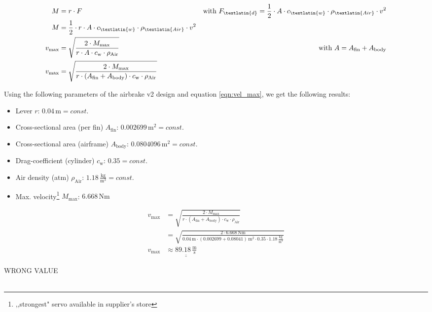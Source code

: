 \documentclass[fontsize=11pt,%
twoside,%
BCOR          = 8mm, %
DIV           = 11,  %
titlepage     = off,%
index=totoc,%
xcolor        = pdftex,%
dvipsnames,%
bibliography  = totoc,%
bibliography = numbered, %
listof        = notnumbered]{scrreprt}
\begin{document}
\begin{subequations}
	\begin{align}
		M &= r\cdot F & \text{with } F_\textlatin{d} = \frac{1}{2} \cdot A \cdot c_\textlatin{w} \cdot \rho_\textlatin{Air} \cdot v^2 \\
		M &= \frac{1}{2}\cdot r\cdot A \cdot c_\textlatin{w} \cdot \rho_\textlatin{Air} \cdot v^2 \\
		v_\text{max} &= \sqrt{\frac{2\cdot M_\text{max}}{r\cdot A\cdot c_\text{w}\cdot \rho_\text{Air}}} & \text{with } A = A_\text{fin} + A_\text{body} \\
		v_\text{max} &= \sqrt{\frac{2\cdot M_\text{max}}{r\cdot (A_\text{fin} + A_\text{body})\cdot c_\text{w}\cdot \rho_\text{Air}}}
		\label{eqn:vel_max}
	\end{align}
\end{subequations}

\newpage

Using the following parameters of the airbrake v2 design and equation \ref{eqn:vel_max}, we get the following results:

\begin{itemize}
	\item Lever $r$:  $0.04\,\text{m}=const.$
	\item Cross-sectional area (per fin) $A_\text{fin}$: $0.002699\,\text{m}^2=const.$
	\item Cross-sectional area (airframe) $A_\text{body}$: $0.0804096\,\text{m}^2=const.$
	\item Drag-coefficient (cylinder) $c_\text{w}$: $0.35=const.$
	\item Air density (atm) $\rho_\text{Air}$: $1.18\,\frac{\text{kg}}{\text{m}^3}=const.$
	\item Max. velocity\footnote{,,strongest" servo available in supplier's store} $M_\text{max}$: $6.668\,\text{Nm}$
\end{itemize}

\begin{align*}
	v_\text{max} &= \sqrt{\frac{2\cdot M_\text{max}}{r\cdot (A_\text{fin} + A_\text{body})\cdot c_\text{w}\cdot \rho_\text{Air}}}\\
	&= \sqrt{\frac{2\cdot 6.668\,\text{Nm}}{0.04\,\text{m}\cdot (0.002699 + 0.08041)\,\text{m}^2\cdot 0.35\cdot 1.18\,\frac{\text{kg}}{\text{m}^3}}}\\
	v_\text{max} &\approx \underline{\underline{ 89.18\,\frac{\text{m}}{\text{s}}}}
\end{align*}

WRONG VALUE\\\\
\end{document}
